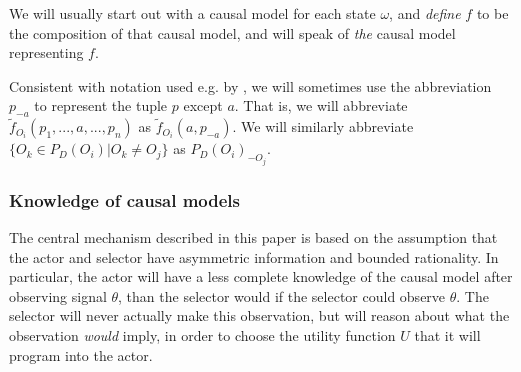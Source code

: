 We will usually start out with a causal model for each state $\omega$, and \textit{define} $f$ to be the composition of that causal model, and will speak of \textit{the} causal model representing $f$.


\begin{notation*}
	Consistent with notation used e.g. by \citet{Mas-Colell1995}, we will sometimes use the abbreviation $p_{-a}$ to represent the tuple $p$ except $a$. That is, we will abbreviate $\tilde f_{O_i}(p_1,...,a,...,p_n)$ as $\tilde f_{O_i}(a, p_{-a})$. We will similarly abbreviate $\{O_k\in P_D(O_i)|O_k\neq O_j\}$ as $P_D(O_i)_{-O_j}$.
\end{notation*}

\subsubsection{Knowledge of causal models} \label{sec:causal:knowledge}

The central mechanism described in this paper is based on the assumption that the actor and selector have asymmetric information and bounded rationality. In particular, the actor will have a less complete knowledge of the causal model after observing signal $\theta$, than the selector would if the selector could observe $\theta$. The selector will never actually make this observation, but will reason about what the observation \textit{would} imply, in order to choose the utility function $U$ that it will program into the actor.

